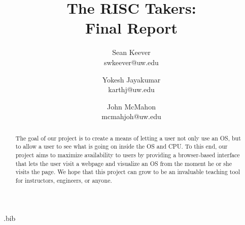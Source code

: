 \usepackage{filecontents}
\raggedbottom

\usepackage{graphicx}
\usepackage{float}
\graphicspath{ {../images/}}

\begin{filecontents}{\jobname.bib}

\end{filecontents}



\date{}

\title{\Large \bf The RISC Takers:\\
  Final Report}

\author{
  {\rm Sean Keever} \\
  swkeever@uw.edu
  \and
  {\rm Yokesh Jayakumar} \\
  karthj@uw.edu
  \and
  {\rm John McMahon} \\
  mcmahjoh@uw.edu
} %

\maketitle

\begin{abstract}
  The goal of our project is to create a means of letting a user not only use an OS,
  but to allow a user to see what is going on inside the OS and CPU.
  To this end, our project aims to maximize availability to users by
  providing a browser-based interface that lets the user visit a webpage and
  visualize an OS from the moment he or she visits the page. We hope that this project
  can grow to be an invaluable teaching tool for instructors, engineers, or anyone.
\end{abstract}

